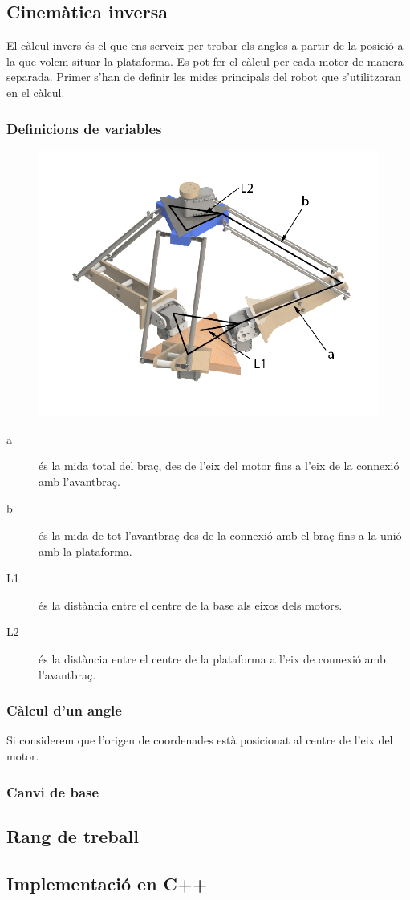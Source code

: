 \subsection{Cinemàtica inversa}

El càlcul invers és el que ens serveix per trobar els angles a partir de la posició a la que volem situar la plataforma. Es pot fer el càlcul per cada motor de manera separada. Primer s'han de definir les mides principals del robot que s'utilitzaran en el càlcul.

\subsubsection{Definicions de variables}
\begin{figure}[h!]
\centering
\includegraphics[width=12cm]{./imgComp/esquema_general}
\end{figure}

\begin{description}
\item[a] és la mida total del braç, des de l'eix del motor fins a l'eix de la connexió amb l'avantbraç.
\item[b] és la mida de tot l'avantbraç des de la connexió amb el braç fins a la unió amb la plataforma.
\item[L1] és la distància entre el centre de la base als eixos dels motors.
\item[L2] és la distància entre el centre de la plataforma a l'eix de connexió amb l'avantbraç.
\end{description}

\subsubsection{Càlcul d'un angle}
Si considerem que l'origen de coordenades està posicionat al centre de l'eix del motor. 


\subsubsection{Canvi de base}

\subsection{Rang de treball}

\subsection{Implementació en C++}